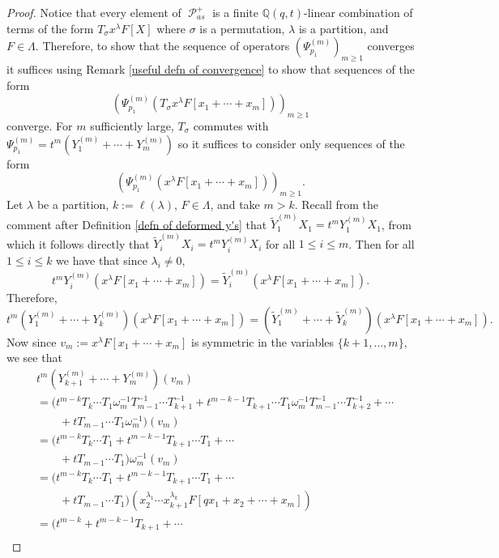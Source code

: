 \documentclass[ALCO,Unicode]{cedram}
\DeclareMathOperator{\sP}{\mathscr{P} }
\begin{document}
\begin{proof}
    Notice that every element of $\sP_{as}^{+}$ is a finite $\mathbb{Q}(q,t)$-linear combination of terms of the form $T_{\sigma}x^{\lambda}F[X]$ where $\sigma$ is a permutation, $\lambda$ is a partition, and $F\in \Lambda$. Therefore, to show that the sequence of operators $(\Psi_{p_1}^{(m)})_{m\geq 1}$ converges it suffices using Remark \ref{useful defn of convergence} to show that sequences of the form 
    $$(\Psi_{p_1}^{(m)}(T_{\sigma}x^{\lambda}F[x_1+ \cdots +x_m]))_{m \geq 1} $$ converge. For $m$ sufficiently large, $T_{\sigma}$ commutes with $\Psi_{p_1}^{(m)} = t^m(Y_{1}^{(m)}+ \cdots + Y_{m}^{(m)})$ so it suffices to consider only sequences of the form $$(\Psi_{p_1}^{(m)}(x^{\lambda}F[x_1+ \cdots +x_m])) _{m \geq 1} .$$ Let $\lambda$ be a partition, $k := \ell(\lambda)$, $F\in \Lambda$, and take $m > k$. Recall from the comment after Definition \ref{defn of deformed y's} that $\widetilde{Y}_1^{(m)}X_1 = t^mY_{1}^{(m)}X_1$, from which it follows directly that $\widetilde{Y}_i^{(m)}X_i = t^mY_{i}^{(m)}X_i$ for all $1 \leq i \leq m$. Then for all $1\leq i \leq k$ we have that since $\lambda_i \neq 0$, 
    $$t^mY_i^{(m)}(x^{\lambda}F[x_1+\cdots+x_m]) = \widetilde{Y}_{i}^{(m)}(x^{\lambda}F[x_1+\cdots+x_m]).$$
    Therefore, 
    $$t^m(Y_1^{(m)}+ \cdots +Y_k^{(m)})(x^{\lambda}F[x_1+ \cdots +x_m]) = (\widetilde{Y}_{1}^{(m)}+ \cdots + \widetilde{Y}_{k}^{(m)})(x^{\lambda}F[x_1+ \cdots +x_m]).$$
    Now since $v_m:=x^{\lambda}F[x_1+\cdots+x_m]$ is symmetric in the variables $\{k+1,\ldots,m\},$ we see that     
    \begin{align*}
        &t^m(Y_{k+1}^{(m)}+ \cdots + Y_{m}^{(m)})(v_m) \\
        &= (t^{m-k}T_{k}\cdots T_1 \omega_m^{-1}T_{m-1}^{-1}\cdots T_{k+1}^{-1} + t^{m-k-1}T_{k+1}\cdots T_1 \omega^{-1}_{m}T_{m-1}^{-1}\cdots T_{k+2}^{-1} + \cdots \\
          & \qquad + tT_{m-1}\cdots T_1 \omega_{m}^{-1})(v_m) \\
        &= (t^{m-k}T_{k}\cdots T_1 + t^{m-k-1}T_{k+1}\cdots T_1 + \cdots \\
          & \qquad + tT_{m-1}\cdots T_1)\omega_m^{-1}(v_m) \\
        &= (t^{m-k}T_{k}\cdots T_1 + t^{m-k-1}T_{k+1}\cdots T_1 + \cdots \\
          & \qquad + tT_{m-1}\cdots T_1)(x_2^{\lambda_1}\cdots x_{k+1}^{\lambda_{k}}F[qx_1+x_2+ \cdots + x_m])\\
        &= (t^{m-k}+t^{m-k-1}T_{k+1}+ \cdots \\

\end{align*}
\end{proof}
\end{document}
